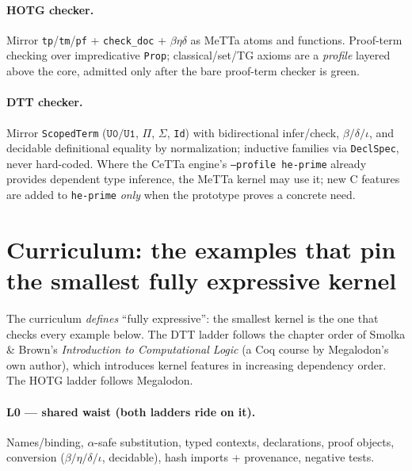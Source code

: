 \documentclass[11pt]{article}
\newcommand{\MeTTa}{MeTTa}
\newcommand{\CeTTa}{CeTTa}
\newcommand{\HOTG}{HOTG}
\newcommand{\DTT}{DTT}
\newcommand{\code}[1]{\texttt{#1}}
\begin{document}
\paragraph{\HOTG{} checker.} Mirror \code{tp}/\code{tm}/\code{pf} + \code{check\_doc}
+ $\beta\eta\delta$ as \MeTTa{} atoms and functions. Proof-term checking over
impredicative \code{Prop}; classical/set/TG axioms are a \emph{profile} layered
above the core, admitted only after the bare proof-term checker is green.

\paragraph{\DTT{} checker.} Mirror \code{ScopedTerm} ($\code{U0}/\code{U1}$, $\Pi$,
$\Sigma$, \code{Id}) with bidirectional infer/check, $\beta/\delta/\iota$, and
decidable definitional equality by normalization; inductive families via
\code{DeclSpec}, never hard-coded. Where the \CeTTa{} engine's \code{--profile
he-prime} already provides dependent type inference, the \MeTTa{} kernel may use it;
new C features are added to \code{he-prime} \emph{only} when the prototype proves a
concrete need.

\section{Curriculum: the examples that pin the smallest fully expressive kernel}
\label{sec:curric}

The curriculum \emph{defines} ``fully expressive'': the smallest kernel is the one
that checks every example below. The \DTT{} ladder follows the chapter order of
Smolka \& Brown's \emph{Introduction to Computational Logic} (a Coq course by
Megalodon's own author), which introduces kernel features in increasing dependency
order. The \HOTG{} ladder follows Megalodon.

\paragraph{L0 --- shared waist (both ladders ride on it).} Names/binding,
$\alpha$-safe substitution, typed contexts, declarations, proof objects,
conversion ($\beta/\eta/\delta/\iota$, decidable), hash imports + provenance,
negative tests.
\end{document}
